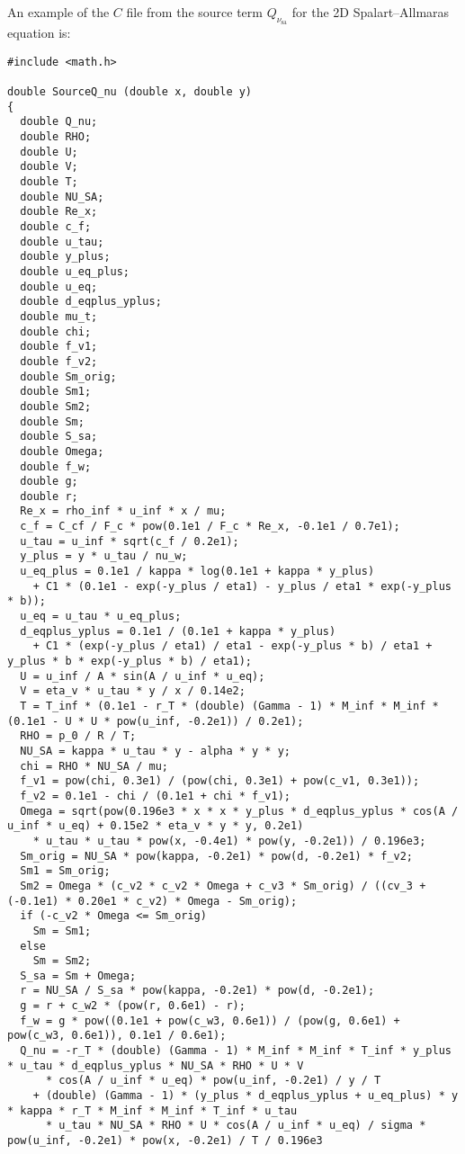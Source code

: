 \documentclass[10pt]{article}
\newcommand{\sa}{\nu_{\mathrm{sa}}}
\begin{document}
An example of the $C$ file from the source term $Q_{\sa}$ for the 2D Spalart--Allmaras equation is:
\begin{footnotesize}
\begin{verbatim}
#include <math.h>

double SourceQ_nu (double x, double y)
{
  double Q_nu;
  double RHO;
  double U;
  double V;
  double T;
  double NU_SA;
  double Re_x;
  double c_f;
  double u_tau;
  double y_plus;
  double u_eq_plus;
  double u_eq;
  double d_eqplus_yplus;
  double mu_t;
  double chi;
  double f_v1;
  double f_v2;
  double Sm_orig;
  double Sm1;
  double Sm2;
  double Sm;
  double S_sa;
  double Omega;
  double f_w;
  double g;
  double r;
  Re_x = rho_inf * u_inf * x / mu;
  c_f = C_cf / F_c * pow(0.1e1 / F_c * Re_x, -0.1e1 / 0.7e1);
  u_tau = u_inf * sqrt(c_f / 0.2e1);
  y_plus = y * u_tau / nu_w;
  u_eq_plus = 0.1e1 / kappa * log(0.1e1 + kappa * y_plus) 
    + C1 * (0.1e1 - exp(-y_plus / eta1) - y_plus / eta1 * exp(-y_plus * b));
  u_eq = u_tau * u_eq_plus;
  d_eqplus_yplus = 0.1e1 / (0.1e1 + kappa * y_plus) 
    + C1 * (exp(-y_plus / eta1) / eta1 - exp(-y_plus * b) / eta1 + y_plus * b * exp(-y_plus * b) / eta1);
  U = u_inf / A * sin(A / u_inf * u_eq);
  V = eta_v * u_tau * y / x / 0.14e2;
  T = T_inf * (0.1e1 - r_T * (double) (Gamma - 1) * M_inf * M_inf * (0.1e1 - U * U * pow(u_inf, -0.2e1)) / 0.2e1);
  RHO = p_0 / R / T;
  NU_SA = kappa * u_tau * y - alpha * y * y;
  chi = RHO * NU_SA / mu;
  f_v1 = pow(chi, 0.3e1) / (pow(chi, 0.3e1) + pow(c_v1, 0.3e1));
  f_v2 = 0.1e1 - chi / (0.1e1 + chi * f_v1);
  Omega = sqrt(pow(0.196e3 * x * x * y_plus * d_eqplus_yplus * cos(A / u_inf * u_eq) + 0.15e2 * eta_v * y * y, 0.2e1) 
    * u_tau * u_tau * pow(x, -0.4e1) * pow(y, -0.2e1)) / 0.196e3;
  Sm_orig = NU_SA * pow(kappa, -0.2e1) * pow(d, -0.2e1) * f_v2;
  Sm1 = Sm_orig;
  Sm2 = Omega * (c_v2 * c_v2 * Omega + c_v3 * Sm_orig) / ((cv_3 + (-0.1e1) * 0.20e1 * c_v2) * Omega - Sm_orig);
  if (-c_v2 * Omega <= Sm_orig)
    Sm = Sm1;
  else
    Sm = Sm2;
  S_sa = Sm + Omega;
  r = NU_SA / S_sa * pow(kappa, -0.2e1) * pow(d, -0.2e1);
  g = r + c_w2 * (pow(r, 0.6e1) - r);
  f_w = g * pow((0.1e1 + pow(c_w3, 0.6e1)) / (pow(g, 0.6e1) + pow(c_w3, 0.6e1)), 0.1e1 / 0.6e1);
  Q_nu = -r_T * (double) (Gamma - 1) * M_inf * M_inf * T_inf * y_plus * u_tau * d_eqplus_yplus * NU_SA * RHO * U * V 
      * cos(A / u_inf * u_eq) * pow(u_inf, -0.2e1) / y / T 
    + (double) (Gamma - 1) * (y_plus * d_eqplus_yplus + u_eq_plus) * y * kappa * r_T * M_inf * M_inf * T_inf * u_tau 
      * u_tau * NU_SA * RHO * U * cos(A / u_inf * u_eq) / sigma * pow(u_inf, -0.2e1) * pow(x, -0.2e1) / T / 0.196e3 

\end{verbatim}
\end{footnotesize}
\end{document}

